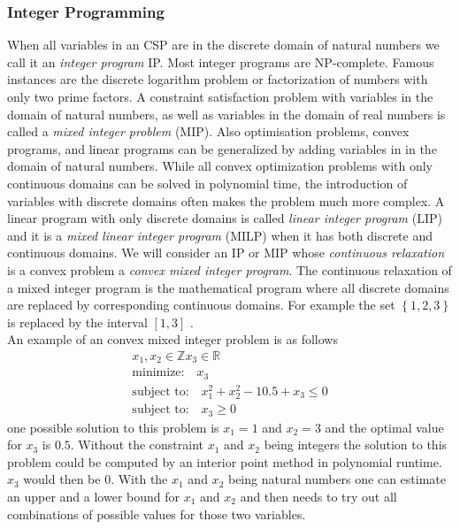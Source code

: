 \subsubsection{Integer Programming}
When all variables in an CSP are in the discrete domain of natural numbers we call it an \emph{integer program} IP. Most integer programs are NP-complete. Famous instances are the discrete logarithm problem or factorization of numbers with only two prime factors. A constraint satisfaction problem with variables in the domain of natural numbers, as well as variables in the domain of real numbers is called a \emph{mixed integer problem} (MIP). Also optimisation problems, convex programs, and linear programs can be generalized by adding variables in in the domain of natural numbers. While all convex optimization problems with only continuous domains can be solved in polynomial time, the introduction of variables with discrete domains often makes the problem much more complex. A linear program with only discrete domains is called \emph{linear integer program} (LIP) and it is a \emph{mixed linear integer program} (MILP) when it has both discrete and continuous domains. We will consider an IP or MIP whose \emph{continuous relaxation} is a convex problem a \emph{convex mixed integer program}. The continuous relaxation of a mixed integer program is the mathematical program where all discrete
domains are replaced by corresponding continuous domains. For example the set 
$\left\lbrace 1,2,3 \right\rbrace $
 is replaced by the interval 
 $\left[ 1,3 \right] $
 .\\
An example of an convex mixed integer problem is as follows
\begin{eqnarray}
x_1,x_2\in \mathbb{Z} x_3\in \mathbb{R}\\
\text{minimize:}\quad x_3 \\
\text{subject to:}\quad x_1^2 + x_2^2 - 10.5 + x_3 \leq 0 \\
\text{subject to:}\quad x_3 \geq 0
\end{eqnarray}
one possible solution to this problem is $x_1=1$ and $x_2=3$ and the optimal value for $x_3$ is $0.5$. Without the constraint $x_1$ and $x_2$ being integers the solution to this problem could be computed by an interior point method in polynomial runtime. $x_3$ would then be $0$. With the $x_1$ and $x_2$ being natural numbers one can estimate an upper and a lower bound for $x_1$ and $x_2$ and then needs to try out all combinations of possible values for those two variables.\\

